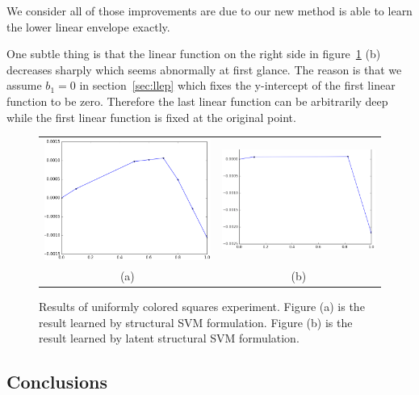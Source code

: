 We consider all of those improvements are due to our new method
is able to learn the lower linear envelope exactly.

One subtle thing is that the linear function on the right side in
figure~\ref{fig:ba_res} (b) decreases sharply which seems
abnormally at first glance. The reason is that we assume $b_1=0$
in section~\ref{sec:llep} which fixes the y-intercept of the
first linear function to be zero. Therefore the last linear
function can be arbitrarily deep while the first linear function
is fixed at the original point.

\begin{figure}[h]
  \centering
  \setlength{\tabcolsep}{2pt}
  \begin{tabular}{cc}
    \includegraphics[width=0.5\columnwidth]{Part2/figures/ba_res_old.png}&
                                                                            \includegraphics[width=0.55\columnwidth]{Part2/figures/ba_res_new.png}\\
    {\small (a)} & {\small (b)} 
  \end{tabular}
  \caption{\label{fig:ba_res} Results of uniformly colored
    squares experiment. Figure (a) is the result learned by
    structural SVM formulation. Figure (b) is the result learned
    by latent structural SVM formulation.}
\end{figure}

\subsection{Conclusions}
\label{sec:synth-check-conc}

